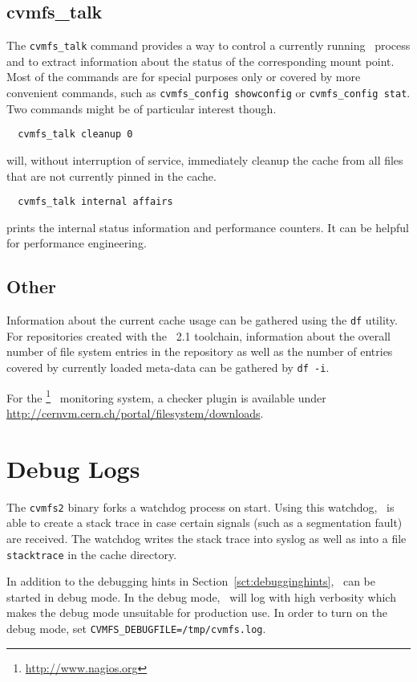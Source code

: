 \subsection{cvmfs\_talk}
The \texttt{cvmfs\_talk} command provides a way to control a currently running \cvmfs\ process and to extract information about the status of the corresponding mount point.
Most of the commands are for special purposes only or covered by more convenient commands, such as \texttt{cvmfs\_config showconfig} or \texttt{cvmfs\_config stat}.
Two commands might be of particular interest though.
\begin{verbatim}
  cvmfs_talk cleanup 0
\end{verbatim}
will, without interruption of service, immediately cleanup the cache from all files that are not currently pinned in the cache.
\begin{verbatim}
  cvmfs_talk internal affairs
\end{verbatim}
prints the internal status information and performance counters.
It can be helpful for performance engineering.

\subsection{Other}
Information about the current cache usage can be gathered using the \texttt{df} utility.
For repositories created with the \cvmfs\ 2.1 toolchain, information about the overall number of file system entries in the repository as well as the number of entries covered by currently loaded meta-data can be gathered by \texttt{df -i}.

For the \nagios\footnote{\url{http://www.nagios.org}}~\cite{nagios08} monitoring system, a checker plugin is available under \url{http://cernvm.cern.ch/portal/filesystem/downloads}.

\section{Debug Logs}
The \texttt{cvmfs2} binary forks a watchdog process on start.
Using this watchdog, \cvmfs\ is able to create a stack trace in case certain signals (such as a segmentation fault) are received.
The watchdog writes the stack trace into syslog as well as into a file \texttt{stacktrace} in the cache directory.

In addition to the debugging hints in Section~\ref{sct:debugginghints}, \cvmfs\ can be started in debug mode.
In the debug mode, \cvmfs\ will log with high verbosity which makes the debug mode unsuitable for production use.
In order to turn on the debug mode, set \texttt{CVMFS\_DEBUGFILE=/tmp/cvmfs.log}.

